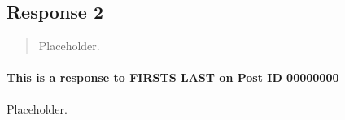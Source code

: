 
\subsection{Response 2}
  \begin{quotation}
    Placeholder.
  \end{quotation}

  \paragraph{This is a response to FIRSTS LAST on Post ID 00000000}
    Placeholder.

